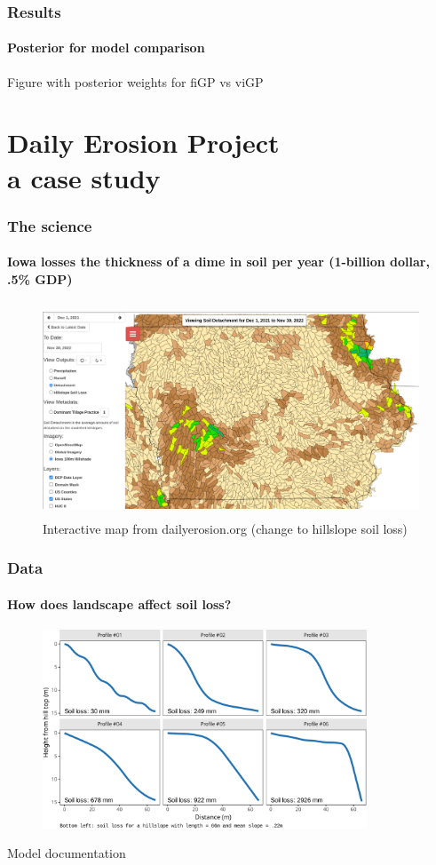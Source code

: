 \documentclass{snedecorbeamer}
\begin{document}
\begin{frame}
  \frametitle{Results}
  \framesubtitle{Posterior for model comparison}

  Figure with posterior weights for fiGP vs viGP
\end{frame}

\section{Daily Erosion Project \\ {\small a case study}}

\begin{frame}
  \frametitle{The science}
  \framesubtitle{Iowa losses the thickness of a dime in soil per year (1-billion
    dollar, .5\% GDP)}

  \begin{figure}
    \centering
    \includegraphics[height=17em]{inc/dep_detachment_map_20220630_168.png}
      \caption{%
        \href{1}{}
        Interactive map from dailyerosion.org (change to hillslope soil loss)}
  \end{figure}
\end{frame}

\begin{frame}
  \frametitle{Data}
  \framesubtitle{How does landscape affect soil loss?}

  \begin{figure}
    \centering
    \includegraphics[height=16em]{inc/wepp_elevation_profiles}
  \end{figure}

  {\tiny
    Model documentation}
\end{frame}
\end{document}
